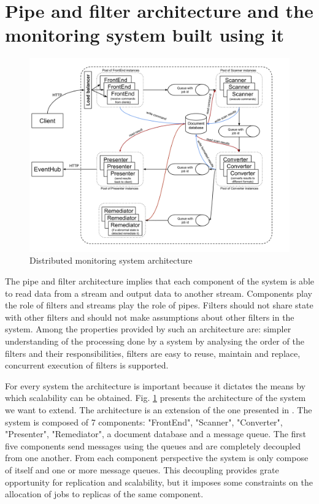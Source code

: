 \section{Pipe and filter architecture and the monitoring system built using it}
\label{sec:architecture}

\begin{figure}[!htb]
\centering
\includegraphics[width=\linewidth]{./img/MonitoringSystemArchitectureRemediation.png}
\caption{Distributed monitoring system architecture}
\label{fig:systemArchitecture}
\end{figure}

The pipe and filter architecture implies that each component of the system is able to read data from a stream and output data to another stream. Components play the role of filters and streams play the role of pipes. Filters should not share state with other filters and should not make assumptions about other filters in the system. Among the properties provided by such an architecture are: simpler understanding of the processing done by a system by analysing the order of the filters and their responsibilities, filters are easy to reuse, maintain and replace, concurrent execution of filters is supported.

For every system the architecture is important because it dictates the means by which scalability can be obtained. Fig. \ref{fig:systemArchitecture} presents the architecture of the system we want to extend. The architecture is an extension of the one presented in \cite{IrimieAndPetcu}. The system is composed of 7 components: "FrontEnd", "Scanner", "Converter", "Presenter", "Remediator", a document database and a message queue. The first five components send messages using the queues and are completely decoupled from one another. From each component perspective the system is only compose of itself and one or more message queues. This decoupling provides grate opportunity for replication and scalability, but it imposes some constraints on the allocation of jobs to replicas of the same component. 

